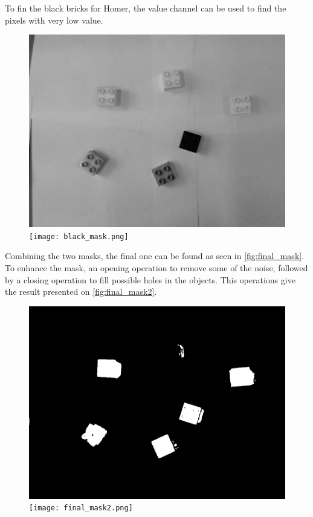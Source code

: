To fin the black bricks for Homer, the value channel can be used to find the pixels with very low value.

\begin{figure}[H]
    \captionbox  %
    {               %
        \label{fig:value}                                  
    }                                                                 
    {                                                                  
        \includegraphics[width=.4\textwidth]{figures/value.png}         
    }                                                                    
    \hspace{5pt}                                                          
    \captionbox
    {       
        \label{fig:black_mask}                                     
    }
    {
        \texttt{[image: black\_mask.png]}            
    }                                                                             
\end{figure}

Combining the two masks, the final one can be found as seen in \autoref{fig:final_mask}. To enhance the mask, an opening operation to remove some of the noise, followed by a closing operation to fill possible holes in the objects. This operations give the result presented on \autoref{fig:final_mask2}.

\begin{figure}[H]
    \captionbox  %
    {               %
        \label{fig:final_mask}                                  
    }                                                                 
    {                                                                  
        \includegraphics[width=.4\textwidth]{figures/final_mask.png}         
    }                                                                    
    \hspace{5pt}                                                          
    \captionbox
    {       
        \label{fig:final_mask2}                                     
    }
    {
        \texttt{[image: final\_mask2.png]}            
    }                                                                             
\end{figure}


